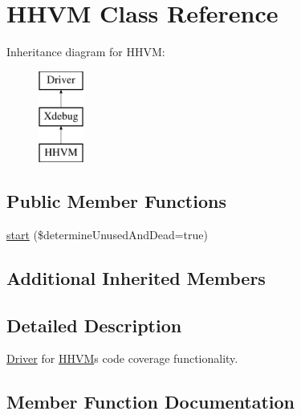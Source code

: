 \hypertarget{class_sebastian_bergmann_1_1_code_coverage_1_1_driver_1_1_h_h_v_m}{}\section{H\+H\+VM Class Reference}
\label{class_sebastian_bergmann_1_1_code_coverage_1_1_driver_1_1_h_h_v_m}
Inheritance diagram for H\+H\+VM\+:\begin{figure}[H]
\begin{center}
\leavevmode
\includegraphics[height=3.000000cm]{class_sebastian_bergmann_1_1_code_coverage_1_1_driver_1_1_h_h_v_m}
\end{center}
\end{figure}
\subsection*{Public Member Functions}
\begin{DoxyCompactItemize}
\item 
\mbox{\hyperlink{class_sebastian_bergmann_1_1_code_coverage_1_1_driver_1_1_h_h_v_m_aa3dfff26cb483c3eadbf2418e1729671}{start}} (\$determine\+Unused\+And\+Dead=true)
\end{DoxyCompactItemize}
\subsection*{Additional Inherited Members}


\subsection{Detailed Description}
\mbox{\hyperlink{interface_sebastian_bergmann_1_1_code_coverage_1_1_driver_1_1_driver}{Driver}} for \mbox{\hyperlink{class_sebastian_bergmann_1_1_code_coverage_1_1_driver_1_1_h_h_v_m}{H\+H\+VM}}\textquotesingle{}s code coverage functionality.

\subsection{Member Function Documentation}
\mbox{\label{class_sebastian_bergmann_1_1_code_coverage_1_1_driver_1_1_h_h_v_m_aa3dfff26cb483c3eadbf2418e1729671}} 
